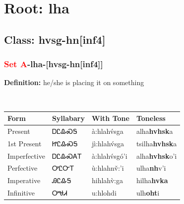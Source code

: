 \needspace{4in}
\section*{Root: lha}
\nopagebreak
{}
\needspace{3in}
\subsection*{Class: hvsg-hn[inf4]}
\nopagebreak
\needspace{2in}
\subsubsection*{\textcolor{Red}{Set A}{-}\textbf{lha}{-}[hvsg-hn[inf4]]}
\nopagebreak
\textbf{Definition: } he/she is placing it on something
\\[0.5em]
\begin{tabularx}{\textwidth}{l X X X}%
\toprule%
\textbf{Form}&\textbf{Syllabary}&\textbf{With Tone}&\textbf{Toneless}\\%
\midrule%
Present&ᎠᏝᎲᏍᎦ&à:hlahv́sga&alha\textbf{hvhsk}a\\%
1st Present&ᏥᏝᎲᏍᎦ&jì:hlahv́sga&tsilha\textbf{hvhsk}a\\%
Imperfective&ᎠᏝᎲᏍᎪᎢ&à:hlahv́sgó’i&alha\textbf{hvhsk}o'i\\%
Perfective&ᎤᏝᏅᎢ&ù:hlahnv̌:’i&ulha\textbf{nh}v'i\\%
Imperative&ᎯᏝᎲᎦ&hihlahv̀:ga&hilha\textbf{hvka}\\%
Infinitive&ᎤᏠᏗ&u:hlohdi&ulh\textbf{oht}i\\%
\bottomrule%
\end{tabularx}
\\[1em]